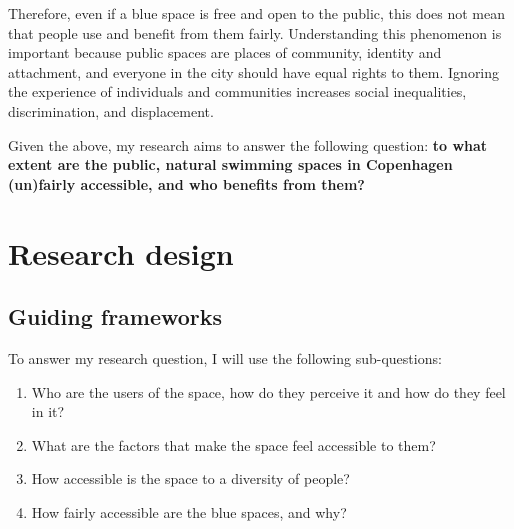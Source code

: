 \documentclass{article}
\begin{document}
Therefore, even if a blue space is free and open to the public, this does not mean that people use and benefit from them fairly. Understanding this phenomenon is important because public spaces are places of community, identity and attachment, and everyone in the city should have equal rights to them. Ignoring the experience of individuals and communities increases social inequalities, discrimination, and displacement.

Given the above, my research aims to answer the following question: \textbf{to what extent are the public, natural swimming spaces in Copenhagen (un)fairly accessible, and who benefits from them?}


\section{Research design}

\subsection{Guiding frameworks}

To answer my research question, I will use the following sub-questions:

\begin{enumerate}
	\item Who are the users of the space, how do they perceive it and how do they feel in it?
	\item What are the factors that make the space feel accessible to them?
	\item How accessible is the space to a diversity of people?
	\item How fairly accessible are the blue spaces, and why?
\end{enumerate}
\end{document}
